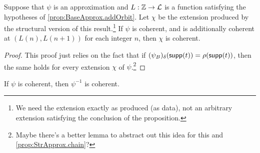 \begin{proposition}
  \label{prop:StrApprox.addOrbit}
  \leanok
  Suppose that \( \psi \) is an approximation and \( L : \mathbb Z \to {\mathcal L} \) is a function satisfying the hypotheses of \cref{prop:BaseApprox.addOrbit}.
  Let \( \chi \) be the extension produced by the structural version of this result.\footnote{We need the extension exactly as produced (as data), not an arbitrary extension satisfying the conclusion of the proposition.}
  If \( \psi \) is coherent, and is additionally coherent at \( (L(n), L(n+1)) \) for each integer \( n \), then \( \chi \) is coherent.
\end{proposition}
\begin{proof}
  \leanok
  This proof just relies on the fact that if \( (\psi_B)_\delta(\operatorname{\mathsf{supp}}(t)) = \rho(\operatorname{\mathsf{supp}}(t)) \), then the same holds for every extension \( \chi \) of \( \psi \).\footnote{Maybe there's a better lemma to abstract out this idea for this and \cref{prop:StrApprox.chain}?}
\end{proof}
\begin{proposition}
  \label{prop:StrApprox.Coherent.inv}
  If \( \psi \) is coherent, then \( \psi^{-1} \) is coherent.
\end{proposition}
